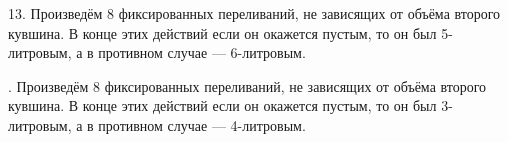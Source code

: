 13. Произведём 8 фиксированных переливаний, не зависящих от объёма второго кувшина. В конце этих действий если он окажется пустым, то он был 5-литровым, а в противном случае --- 6-литровым.
\begin{center}
\begin{figure}[h!]
\end{figure}
\end{center}
\newpage
{}. Произведём 8 фиксированных переливаний, не зависящих от объёма второго кувшина. В конце этих действий если он окажется пустым, то он был 3-литровым, а в противном случае --- 4-литровым.
\begin{center}
\begin{figure}[h!]
\end{figure}
\end{center}
